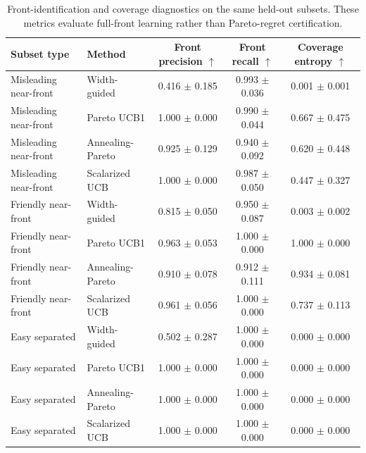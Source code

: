 \begin{table}[t]
\centering
\caption{Front-identification and coverage diagnostics on the same held-out subsets. These metrics evaluate full-front learning rather than Pareto-regret certification.}
\label{tab:real-front-coverage}
\scriptsize
\begin{tabular}{llccc}
\toprule
Subset type & Method & Front precision $\uparrow$ & Front recall $\uparrow$ & Coverage entropy $\uparrow$ \\
\midrule
Misleading near-front & Width-guided & 0.416 $\pm$ 0.185 & 0.993 $\pm$ 0.036 & 0.001 $\pm$ 0.001 \\
Misleading near-front & Pareto UCB1 & 1.000 $\pm$ 0.000 & 0.990 $\pm$ 0.044 & 0.667 $\pm$ 0.475 \\
Misleading near-front & Annealing-Pareto & 0.925 $\pm$ 0.129 & 0.940 $\pm$ 0.092 & 0.620 $\pm$ 0.448 \\
Misleading near-front & Scalarized UCB & 1.000 $\pm$ 0.000 & 0.987 $\pm$ 0.050 & 0.447 $\pm$ 0.327 \\
\midrule
Friendly near-front & Width-guided & 0.815 $\pm$ 0.050 & 0.950 $\pm$ 0.087 & 0.003 $\pm$ 0.002 \\
Friendly near-front & Pareto UCB1 & 0.963 $\pm$ 0.053 & 1.000 $\pm$ 0.000 & 1.000 $\pm$ 0.000 \\
Friendly near-front & Annealing-Pareto & 0.910 $\pm$ 0.078 & 0.912 $\pm$ 0.111 & 0.934 $\pm$ 0.081 \\
Friendly near-front & Scalarized UCB & 0.961 $\pm$ 0.056 & 1.000 $\pm$ 0.000 & 0.737 $\pm$ 0.113 \\
\midrule
Easy separated & Width-guided & 0.502 $\pm$ 0.287 & 1.000 $\pm$ 0.000 & 0.000 $\pm$ 0.000 \\
Easy separated & Pareto UCB1 & 1.000 $\pm$ 0.000 & 1.000 $\pm$ 0.000 & 0.000 $\pm$ 0.000 \\
Easy separated & Annealing-Pareto & 1.000 $\pm$ 0.000 & 1.000 $\pm$ 0.000 & 0.000 $\pm$ 0.000 \\
Easy separated & Scalarized UCB & 1.000 $\pm$ 0.000 & 1.000 $\pm$ 0.000 & 0.000 $\pm$ 0.000 \\
\bottomrule
\end{tabular}
\end{table}
